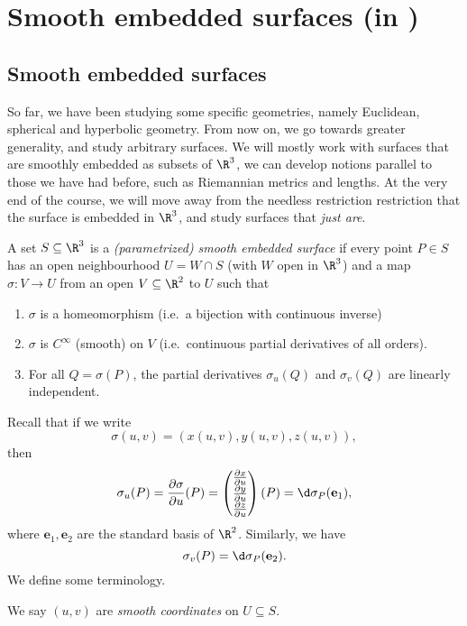 \documentclass[a4paper]{article}
\begin{document}
\section{Smooth embedded surfaces (in )}
\subsection{Smooth embedded surfaces}
So far, we have been studying some specific geometries, namely Euclidean, spherical and hyperbolic geometry. From now on, we go towards greater generality, and study arbitrary surfaces. We will mostly work with surfaces that are smoothly embedded as subsets of $\R^3$, we can develop notions parallel to those we have had before, such as Riemannian metrics and lengths. At the very end of the course, we will move away from the needless restriction restriction that the surface is embedded in $\R^3$, and study surfaces that \emph{just are}.

\begin{defi}
  A set $S \subseteq \R^3$ is a \emph{(parametrized) smooth embedded surface} if every point $P \in S$ has an open neighbourhood $U = W \cap S$ (with $W$ open in $\R^3$) and a map $\sigma: V \to U$ from an open $V \subseteq \R^2$ to $U$ such that
  \begin{enumerate}
    \item $\sigma$ is a homeomorphism (i.e.\ a bijection with continuous inverse)
    \item $\sigma$ is $C^\infty$ (smooth) on $V$ (i.e.\ continuous partial derivatives of all orders).
    \item For all $Q = \sigma(P)$, the partial derivatives $\sigma_u(Q)$ and $\sigma_v(Q)$ are linearly independent.
  \end{enumerate}
\end{defi}
Recall that if we write
\[
  \sigma(u, v) = (x(u, v), y(u, v), z(u, v)),
\]
then
\[
  \sigma_u(P) = \frac{\partial \sigma}{\partial u}(P) =
  \begin{pmatrix}
    \frac{\partial x}{\partial u}\\
    \frac{\partial y}{\partial u}\\
    \frac{\partial z}{\partial u}
  \end{pmatrix}
  (P)
  = \d\sigma_P (\mathbf{e}_1),
\]
where $\mathbf{e}_1, \mathbf{e}_2$ are the standard basis of $\R^2$. Similarly, we have
\[
  \sigma_v(P) = \d \sigma_P(\mathbf{e}_2).
\]
We define some terminology.
\begin{defi}
  We say $(u, v)$ are \emph{smooth coordinates} on $U \subseteq S$.
\end{defi}
\end{document}
